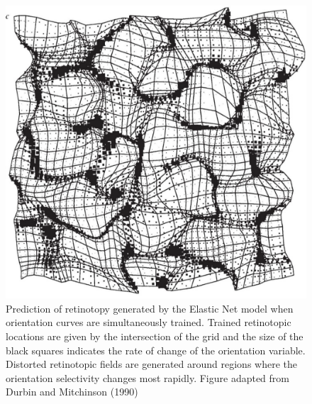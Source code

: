 \begin{figure}
	\centering
	\includegraphics[width=\textwidth]{images/introduction/distortedretinotopy}
	\def\c{Prediction of retinotopy generated by the Elastic Net model when orientation curves are simultaneously trained. }
	\caption[\c]{\label{fig:distortedretinotopy} \c Trained retinotopic locations are given by the intersection of the grid and the size of the black squares indicates the rate of change of the orientation variable. Distorted retinotopic fields are generated around regions where the orientation selectivity changes most rapidly. Figure adapted from Durbin and Mitchinson (1990) \cite{Durbin1990-tn}}
\end{figure}


